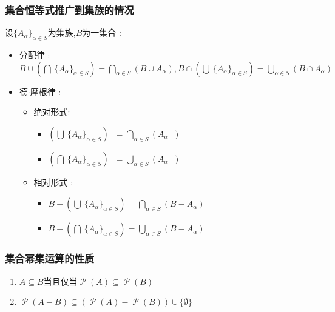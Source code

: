 \documentclass[UTF8,12pt]{ctexbook}
\newcommand{\updownUnion}[2]{\bigcup\limits_{#2}^{#1}}
\newcommand{\updownIntersection}[2]{\bigcap\limits_{#2}^{#1}}
\newcommand{\powerSetOf}[1]{\powerSet (#1)}
\DeclareMathOperator{\powerSet}{\mathcal{P}}
\DeclareMathOperator{\unionSet}{\cup}
\DeclareMathOperator{\intersectionSet}{\cap}
\DeclareMathOperator{\absoluteCompletementSet}{^\complement}
\begin{document}
{{{{\subsubsection{集合恒等式推广到集族的情况}{
设$\{A_\alpha\}_{\alpha \in S}$为集族,$B$为一集合 :

\begin{itemize}
  \item 分配律 : $B \unionSet (\updownIntersection{~}{~}\{A_\alpha\}_{\alpha \in S}) = \updownIntersection{~}{\alpha \in S}(B \unionSet A_\alpha),B \intersectionSet (\updownUnion{~}{~}\{A_\alpha\}_{\alpha \in S}) = \updownUnion{~}{\alpha \in S}(B \intersectionSet A_\alpha)$
  \item 德$\cdot$摩根律 : \begin{itemize}
          \item 绝对形式: \begin{itemize}
                  \item $(\updownUnion{~}{~}\{A_\alpha\}_{\alpha \in S})\absoluteCompletementSet = \updownIntersection{~}{\alpha \in S}(A_\alpha\absoluteCompletementSet)$
                  \item$(\updownIntersection{~}{~}\{A_\alpha\}_{\alpha \in S})\absoluteCompletementSet = \updownUnion{~}{\alpha \in S}(A_\alpha\absoluteCompletementSet)$
                \end{itemize}
          \item 相对形式 : \begin{itemize}
                  \item $B - (\updownUnion{~}{~}\{A_\alpha\}_{\alpha \in S}) = \updownIntersection{~}{\alpha \in S}(B - A_\alpha)$
                  \item $B - (\updownIntersection{~}{~}\{A_\alpha\}_{\alpha \in S}) = \updownUnion{~}{\alpha \in S}(B - A_\alpha)$
                \end{itemize}
        \end{itemize}
\end{itemize}
}%

\subsubsection{集合幂集运算的性质}{
  \begin{enumerate}
    \item $A \subseteq B$当且仅当$\powerSetOf{A} \subseteq \powerSetOf{B}$
    \item $\powerSetOf{A - B} \subseteq (\powerSetOf{A} - \powerSetOf{B}) \unionSet \{\emptyset\}$
  \end{enumerate}
}%

}}}}
\end{document}

